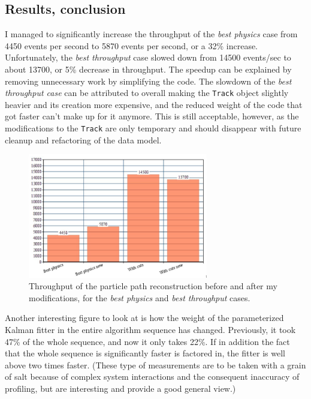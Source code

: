 \documentclass[12pt]{article}
\newcommand{\code}[1]{\texttt{#1}}
\begin{document}
\subsection{Results, conclusion}

I managed to significantly increase the throughput of the \textit{best physics} case from 4450 events per second to 5870 events per second, or a 32\% increase. Unfortunately, the \textit{best throughput} case slowed down from 14500 events/sec to about 13700, or 5\% decrease in throughput. The speedup can be explained by removing unnecessary work by simplifying the code. The slowdown of the \textit{best throughput case} can be attributed to overall making the \code{Track} object slightly heavier and its creation more expensive, and the reduced weight of the code that got faster can't make up for it anymore. This is still acceptable, however, as the modifications to the \code{Track} are only temporary and should disappear with future cleanup and refactoring of the data model.

\begin{figure}[H]
	\begin{center}
		\includegraphics[width=0.7\textwidth]{kalmanfit_throughput_results_lowquality}
	\end{center}
	\caption{Throughput of the particle path reconstruction before and after my modifications, for the \textit{best physics} and \textit{best throughput} cases.}
	\label{fig_kalmanfit_results_throughput}
\end{figure}

Another interesting figure to look at is how the weight of the parameterized Kalman fitter in the entire algorithm sequence has changed. Previously, it took 47\% of the whole sequence, and now it only takes 22\%. If in addition the fact that the whole sequence is significantly faster is factored in, the fitter is well above two times faster. \small (These type of measurements are to be taken with a grain of salt because of complex system interactions and the consequent inaccuracy of profiling, but are interesting and provide a good general view.) \normalsize
\end{document}
